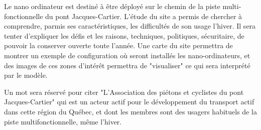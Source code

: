 \par Le nano ordinateur est destiné à être déployé sur le chemin de la piste multi-fonctionnelle du pont Jacques-Cartier. L'étude du site a permis de chercher à comprendre, parmis ses caractéristiques, les difficultés de son usage l'hiver. Il sera tenter d'expliquer les défis et les raisons, techniques, politiques, sécuritaire, de pouvoir la conserver ouverte toute l'année. Une carte du site permettra de montrer un exemple de configuration où seront installés les nano-ordinateurs, et des images de ces  zones d'intérêt permettra de "visualiser" ce qui sera interprété par le modèle. 
\par Un mot sera réservé pour citer "L'Association des piétons et cyclistes du pont Jacques-Cartier" qui est un acteur actif pour le développement du transport actif dans cette région du Québec, et dont les membres sont des usagers habituels de la piste multifonctionnelle, même l'hiver.
\vspace{1\baselineskip}
\par 